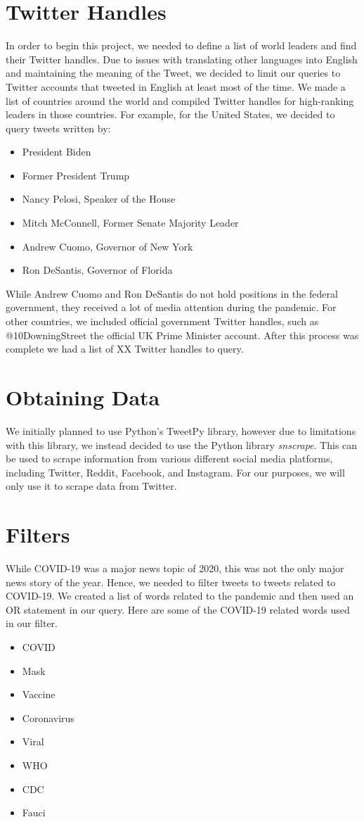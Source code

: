 \documentclass[sigconf]{acmart}
\begin{document}
	\section{Twitter Handles}
	In order to begin this project, we needed to define a list of world leaders and find their Twitter handles. Due to issues with translating other languages into English and maintaining the meaning of the Tweet, we decided to limit our queries to Twitter accounts that tweeted in English at least most of the time. 
	We made a list of countries around the world and compiled Twitter handles for high-ranking leaders in those countries. For example, for the United States, we decided to query tweets written by:
	\begin{itemize}
		\item President Biden
		\item Former President Trump
		\item Nancy Pelosi, Speaker of the House
		\item Mitch McConnell, Former Senate Majority Leader
		\item Andrew Cuomo, Governor of New York
		\item Ron DeSantis, Governor of Florida
	\end{itemize}
	While Andrew Cuomo and Ron DeSantis do not hold positions in the federal government, they received a lot of media attention during the pandemic. 
	For other countries, we included official government Twitter handles, such as @10DowningStreet the official UK Prime Minister account. 
	After this process was complete we had a list of XX Twitter handles to query. 
	\section{Obtaining Data}
	We initially planned to use Python's TweetPy library, however due to limitations with this library, we instead decided to use the Python  library \textit{snscrape}. This can be used to scrape information from various different social media platforms, including Twitter, Reddit, Facebook, and Instagram. For our purposes, we will only use it to scrape data from Twitter. \cite{snscrape}
	
	\section{Filters}
	While COVID-19 was a major news topic of 2020, this was not the only major news story of the year. Hence, we needed to filter tweets to tweets related to COVID-19. We created a list of words related to the pandemic and then used an OR statement in our query. Here are some of the COVID-19 related words used in our filter. 
	\begin{itemize}
		\item COVID
		\item Mask
		\item Vaccine
		\item Coronavirus
		\item Viral
		\item WHO
		\item CDC
		\item Fauci
	\end{itemize}
\end{document}
